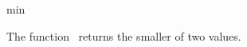 \begin{ccRefFunction}{min}

\ccDefinition

The function \ccRefName\ returns the smaller of two values.


{}

\end{ccRefFunction}
